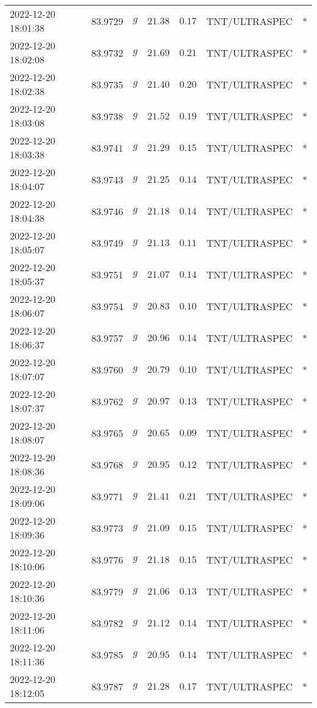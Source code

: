 \documentclass{nature_plusfigure}
\begin{document}
\begin{supplement}
\begin{center}
\begin{longtable}{lllllll}
2022-12-20 18:01:38 & 83.9729 & $g$ & $21.38$ & $0.17$ & TNT/ULTRASPEC & * \\ 
2022-12-20 18:02:08 & 83.9732 & $g$ & $21.69$ & $0.21$ & TNT/ULTRASPEC & * \\ 
2022-12-20 18:02:38 & 83.9735 & $g$ & $21.40$ & $0.20$ & TNT/ULTRASPEC & * \\ 
2022-12-20 18:03:08 & 83.9738 & $g$ & $21.52$ & $0.19$ & TNT/ULTRASPEC & * \\ 
2022-12-20 18:03:38 & 83.9741 & $g$ & $21.29$ & $0.15$ & TNT/ULTRASPEC & * \\ 
2022-12-20 18:04:07 & 83.9743 & $g$ & $21.25$ & $0.14$ & TNT/ULTRASPEC & * \\ 
2022-12-20 18:04:38 & 83.9746 & $g$ & $21.18$ & $0.14$ & TNT/ULTRASPEC & * \\ 
2022-12-20 18:05:07 & 83.9749 & $g$ & $21.13$ & $0.11$ & TNT/ULTRASPEC & * \\ 
2022-12-20 18:05:37 & 83.9751 & $g$ & $21.07$ & $0.14$ & TNT/ULTRASPEC & * \\ 
2022-12-20 18:06:07 & 83.9754 & $g$ & $20.83$ & $0.10$ & TNT/ULTRASPEC & * \\ 
2022-12-20 18:06:37 & 83.9757 & $g$ & $20.96$ & $0.14$ & TNT/ULTRASPEC & * \\ 
2022-12-20 18:07:07 & 83.9760 & $g$ & $20.79$ & $0.10$ & TNT/ULTRASPEC & * \\ 
2022-12-20 18:07:37 & 83.9762 & $g$ & $20.97$ & $0.13$ & TNT/ULTRASPEC & * \\ 
2022-12-20 18:08:07 & 83.9765 & $g$ & $20.65$ & $0.09$ & TNT/ULTRASPEC & * \\ 
2022-12-20 18:08:36 & 83.9768 & $g$ & $20.95$ & $0.12$ & TNT/ULTRASPEC & * \\ 
2022-12-20 18:09:06 & 83.9771 & $g$ & $21.41$ & $0.21$ & TNT/ULTRASPEC & * \\ 
2022-12-20 18:09:36 & 83.9773 & $g$ & $21.09$ & $0.15$ & TNT/ULTRASPEC & * \\ 
2022-12-20 18:10:06 & 83.9776 & $g$ & $21.18$ & $0.15$ & TNT/ULTRASPEC & * \\ 
2022-12-20 18:10:36 & 83.9779 & $g$ & $21.06$ & $0.13$ & TNT/ULTRASPEC & * \\ 
2022-12-20 18:11:06 & 83.9782 & $g$ & $21.12$ & $0.14$ & TNT/ULTRASPEC & * \\ 
2022-12-20 18:11:36 & 83.9785 & $g$ & $20.95$ & $0.14$ & TNT/ULTRASPEC & * \\ 
2022-12-20 18:12:05 & 83.9787 & $g$ & $21.28$ & $0.17$ & TNT/ULTRASPEC & * \\ 

\end{longtable}
\end{center}
\end{supplement}
\end{document}
